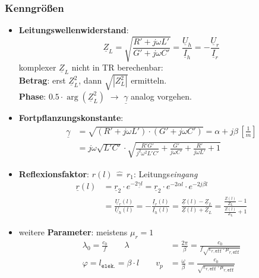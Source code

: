 \subsubsection{Kenngrößen}
\begin{itemize}
	\item \textbf{Leitungswellenwiderstand}:
	      \begin{equation*}
		      \underline{Z}_L = \sqrt{ \frac{R' + j \omega L'}{G' + j \omega C'}} = \frac{\underline{U}_h}{\underline{I}_h} =- \frac{\underline{U}_r}{\underline{I}_r}
	      \end{equation*}
	      komplexer $\underline{Z}_L$ nicht in TR berechenbar:\\
	      \textbf{Betrag}: erst $\underline{Z}_L^2$, dann $\sqrt{|Z_L^2|}$ ermitteln.\\
	      \textbf{Phase}: $0.5 \cdot \arg(\underline{Z}_L^2)$ \quad
	      $\rightarrow$  $\underline{\gamma}$ analog vorgehen.

	\item \textbf{Fortpflanzungskonstante}:
	      \begin{align*}
		      \underline{\gamma} & = \sqrt{(R'+j\omega L')\cdot(G'+j\omega C')} = \alpha + j \beta \, \left[ \frac{1}{m} \right]                             \\
		                         & = j \omega \sqrt{L'C'} \cdot \sqrt{ \frac{R'G'}{j^2 \omega^2 L'C'} + \frac{G'}{j \omega C'} + \frac{R'}{j \omega L'} + 1}
	      \end{align*}

	\item \textbf{Reflexionsfaktor}: \qquad
	      $ r(l) \, \widehat{=} \, r_1 $: Leitungs\textit{eingang}
	      \begin{align*}
		      \underline{r}(l) & = \underline{r}_2 \cdot e^{-2\underline{\gamma}l} = \underline{r}_2\cdot e^{-2\alpha l}\cdot e^{-2j\beta l} \\
		                       & = 	\frac{\underline{U}_r(l)}{\underline{U}_h(l)} = -\frac{\underline{I}_r(l)}{\underline{I}_h(l)}
		      =\frac{\underline{Z}(l)-\underline{Z}_L}{\underline{Z}(l)+\underline{Z}_L} = \frac{\tfrac{Z(l)}{Z_L}-1}{\tfrac{Z(l)}{Z_L}+1}
	      \end{align*}

	\item weitere \textbf{Parameter}: \qquad meistens $ \mu_r = 1 $
	      \begin{align*}
		      \lambda_0  = \frac{c_0}{f} \qquad \lambda     & = \frac{2\pi}{\beta} = \frac{c_0}{f\sqrt{\varepsilon_{r,\texttt{eff}}\cdot \mu_{r,\texttt{eff}}}}  \\
		      \varphi = l_{\texttt{elek.}} = \beta \cdot l \qquad v_p & = \frac{\omega}{\beta} = \frac{c_0}{\sqrt{\varepsilon_{r,\texttt{eff}}\cdot \mu_{r,\texttt{eff}}}}
	      \end{align*}
\end{itemize}

